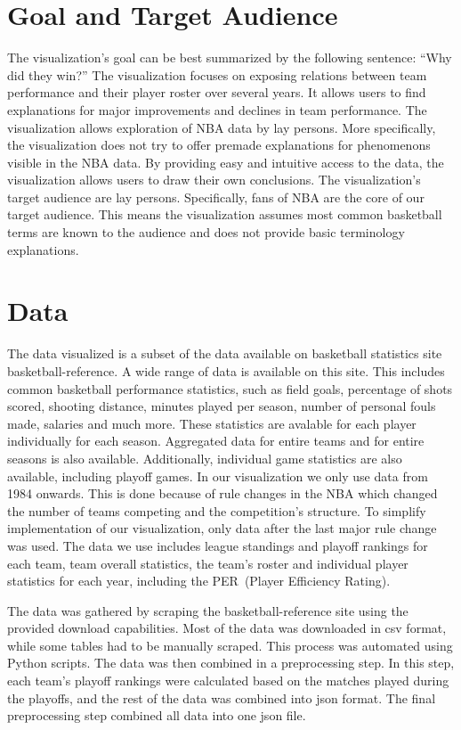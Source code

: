 \documentclass{sigchi}
\begin{document}
\section{Goal and Target Audience}\label{sec:goal} 
The visualization's goal can be best summarized by the following sentence: ``Why
did they win?'' The visualization focuses on exposing relations between team
performance and their player roster over several years. It allows users to find
explanations for major improvements and declines in team performance.  The
visualization allows exploration of NBA data by lay persons.  More specifically,
the visualization does not try to offer premade explanations for phenomenons
visible in the NBA data. By providing easy and intuitive access to the data, the
visualization allows users to draw their own conclusions. The visualization's
target audience are lay persons. Specifically, fans of NBA are the core of our
target audience. This means the visualization assumes most common basketball
terms are known to the audience and does not provide basic terminology
explanations. 

\section{Data}\label{sec:data}
The data visualized is a subset of the data available on basketball statistics
site basketball-reference\cite{basketball-reference}. A wide range of data is
available on this site. This includes common basketball performance statistics,
such as field goals, percentage of shots scored, shooting distance, minutes
played per season, number of personal fouls made, salaries and much more. These
statistics are avalable for each player individually for each season. Aggregated
data for entire teams and for entire seasons is also available. Additionally,
individual game statistics are also available, including playoff games.  In our
visualization we only use data from 1984 onwards. This is done because of rule
changes in the NBA which changed the number of teams competing and the
competition's structure. To simplify implementation of our visualization, only
data after the last major rule change was used.  The data we use includes league
standings and playoff rankings for each team, team overall statistics, the
team's roster and individual player statistics for each year, including the
PER~(Player Efficiency Rating)\cite{per}. 

The data was gathered by scraping the basketball-reference site using the
provided download capabilities. Most of the data was downloaded in csv format,
while some tables had to be manually scraped. This process was automated using
Python scripts. The data was then combined in a preprocessing step. In this
step, each team's playoff rankings were calculated based on the matches played
during the playoffs, and the rest of the data was combined into json format. The
final preprocessing step combined all data into one json file.
\end{document}
